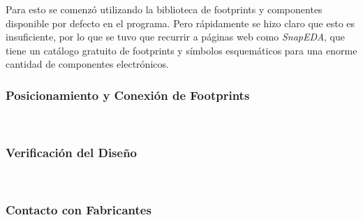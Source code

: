 Para esto se comenzó utilizando la biblioteca de footprints y componentes disponible por defecto en el programa. Pero rápidamente se hizo claro que esto es insuficiente, por lo que se tuvo que recurrir a páginas web como \textit{SnapEDA}, que tiene un catálogo gratuito de footprints y símbolos esquemáticos para una enorme cantidad de componentes electrónicos.\\

\subsubsection{Posicionamiento y Conexión de Footprints}
 
\lipsum[1]\\

\subsubsection{Verificación del Diseño}
 
\lipsum[2]\\

\subsubsection{Contacto con Fabricantes}
 
\lipsum[3]\\